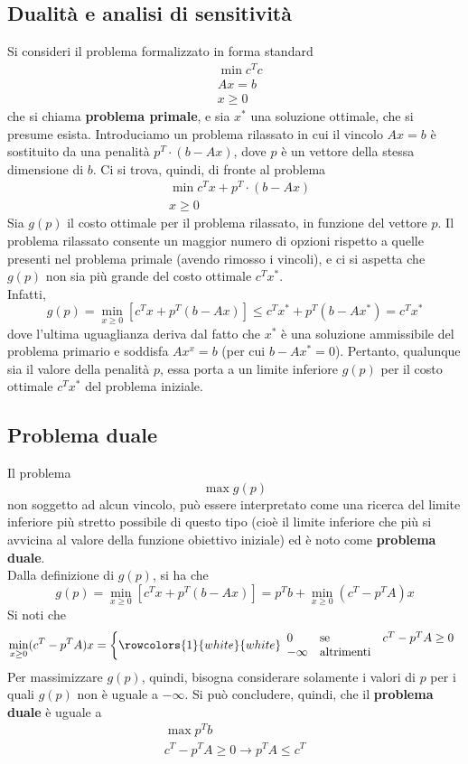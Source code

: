 \documentclass[a4paper]{extarticle}
\begin{document}
\subsection{Dualità e analisi di sensitività}
Si consideri il problema formalizzato in forma standard
\begin{align*}
    &\min c^T c\\
    &Ax=b\\
    &x \geq 0
\end{align*}
che si chiama \textbf{problema primale}, e sia $x^*$ una soluzione ottimale, che si presume esista. Introduciamo un problema rilassato in cui il vincolo $Ax = b$ è sostituito da una penalità $p^T \cdot (b - Ax)$, dove $p$ è un vettore della stessa dimensione di $b$. Ci si trova, quindi, di fronte al problema
\begin{align*}
    &\min c^T x + p^T \cdot (b - Ax)\\
    &x \geq 0    
\end{align*}
Sia $g(p)$ il costo ottimale per il problema rilassato, in funzione del vettore $p$. Il problema rilassato consente un maggior numero di opzioni rispetto a quelle presenti nel problema primale (avendo rimosso i vincoli), e ci si aspetta che $g(p)$ non sia più grande del costo ottimale $c^T x^*$.\\
Infatti,
\[g(p) = \underset{x \geq 0}{\min} \left[c^Tx+p^T(b-Ax)\right] \leq c^Tx^* + p^T(b-Ax^*) = c^Tx^*\]
dove l'ultima uguaglianza deriva dal fatto che $x^*$ è una soluzione ammissibile del problema primario e soddisfa $Ax^x = b$ (per cui $b-Ax^*=0$). Pertanto, qualunque sia il valore della penalità $p$, essa porta a un limite inferiore $g(p)$ per il costo ottimale $c^T x^*$ del problema iniziale.

\vspace{1em}
\noindent
\subsection{Problema duale}
Il problema
\[\max g(p)\]
non soggetto ad alcun vincolo, può essere interpretato come una ricerca del limite inferiore più stretto possibile di questo tipo (cioè il limite inferiore che più si avvicina al valore della funzione obiettivo iniziale) ed è noto come \textbf{problema duale}.\\
Dalla definizione di $g(p)$, si ha che
\[g(p) = \underset{x \geq 0}{\min} \left[c^Tx+p^T(b-Ax)\right] = p^Tb + \underset{x \geq 0}{\min}(c^T - p^TA)x\]
Si noti che
\[
    \underset{x \geq 0}{\min}(c^T - p^TA)x=\left\{
        \rowcolors{1}{white}{white}
        \begin{array}{lll}
            0 & \text{se} & c^T - p^TA \geq 0\\
            -\infty & \text{altrimenti} &\\
        \end{array}
    \right.
\]
Per massimizzare $g(p)$, quindi, bisogna considerare solamente i valori di $p$ per i quali $g(p)$ non è uguale a $-\infty$. Si può concludere, quindi, che il \textbf{problema duale} è uguale a
\begin{align*}
    \max p^T b\\
    c^T - p^TA \geq 0 \rightarrow p^TA \leq c^T
\end{align*}
\end{document}
